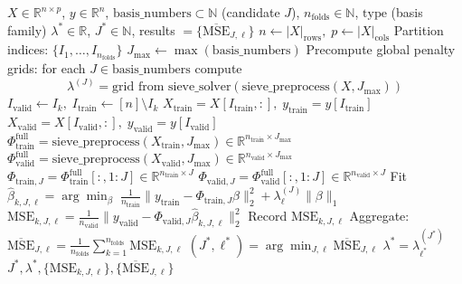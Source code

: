 \documentclass{article}
\begin{document}
\begin{algorithm}
\caption{Cross-Validated High-Dimensional Sieve Estimation}
\label{alg:cv_sieve}
\begin{algorithmic}[1]
\REQUIRE $X \in \mathbb{R}^{n \times p}$, $y \in \mathbb{R}^n$, $\mathrm{basis\_numbers} \subset \mathbb{N}$ (candidate $J$), $n_{\mathrm{folds}} \in \mathbb{N}$, $\mathrm{type}$ (basis family)
\ENSURE $\lambda^* \in \mathbb{R}$, $J^* \in \mathbb{N}$, results $=\{\overline{\mathrm{MSE}}_{J,\ell}\}$
\STATE $n \gets |X|_{\text{rows}},\; p \gets |X|_{\text{cols}}$
\STATE Partition indices: $\{I_1,\dots,I_{n_{\mathrm{folds}}}\}$
\STATE $J_{\max} \gets \max(\mathrm{basis\_numbers})$
\STATE Precompute global penalty grids: for each $J\in\mathrm{basis\_numbers}$ compute
\[\lambda^{(J)} = \text{grid from }\text{sieve\_solver}(\text{sieve\_preprocess}(X,J_{\max}))\]
    \STATE $I_{\text{valid}} \gets I_k,\; I_{\text{train}} \gets [n]\setminus I_k$
    \STATE $X_{\text{train}}=X[I_{\text{train}},:],\; y_{\text{train}}=y[I_{\text{train}}]$
    \STATE $X_{\text{valid}}=X[I_{\text{valid}},:],\; y_{\text{valid}}=y[I_{\text{valid}}]$
    \STATE $\Phi^{\text{full}}_{\text{train}}=\text{sieve\_preprocess}(X_{\text{train}},J_{\max})\in\mathbb{R}^{n_{\text{train}}\times J_{\max}}$
    \STATE $\Phi^{\text{full}}_{\text{valid}}=\text{sieve\_preprocess}(X_{\text{valid}},J_{\max})\in\mathbb{R}^{n_{\text{valid}}\times J_{\max}}$
        \STATE $\Phi_{\text{train},J}=\Phi^{\text{full}}_{\text{train}}[:,1:J]\in\mathbb{R}^{n_{\text{train}}\times J}$
        \STATE $\Phi_{\text{valid},J}=\Phi^{\text{full}}_{\text{valid}}[:,1:J]\in\mathbb{R}^{n_{\text{valid}}\times J}$
            \STATE Fit $\hat{\beta}_{k,J,\ell} = \arg\min_{\beta}\; \frac{1}{n_{\text{train}}}\|y_{\text{train}}-\Phi_{\text{train},J}\beta\|_2^2 + \lambda^{(J)}_{\ell}\|\beta\|_1$
            \STATE $\mathrm{MSE}_{k,J,\ell} = \frac{1}{n_{\text{valid}}}\|y_{\text{valid}}-\Phi_{\text{valid},J}\hat{\beta}_{k,J,\ell}\|_2^2$
            \STATE Record $\mathrm{MSE}_{k,J,\ell}$
        \ENDFOR
    \ENDFOR
\ENDFOR
\STATE Aggregate: $\overline{\mathrm{MSE}}_{J,\ell} = \frac{1}{n_{\mathrm{folds}}}\sum_{k=1}^{n_{\mathrm{folds}}}\mathrm{MSE}_{k,J,\ell}$
\STATE $(J^*,\ell^*) = \arg\min_{J,\ell} \overline{\mathrm{MSE}}_{J,\ell}$
\STATE $\lambda^* = \lambda^{(J^*)}_{\ell^*}$
\RETURN $J^*,\lambda^*, \{\mathrm{MSE}_{k,J,\ell}\}, \{\overline{\mathrm{MSE}}_{J,\ell}\}$
\end{algorithmic}
\end{algorithm}
\end{document}
